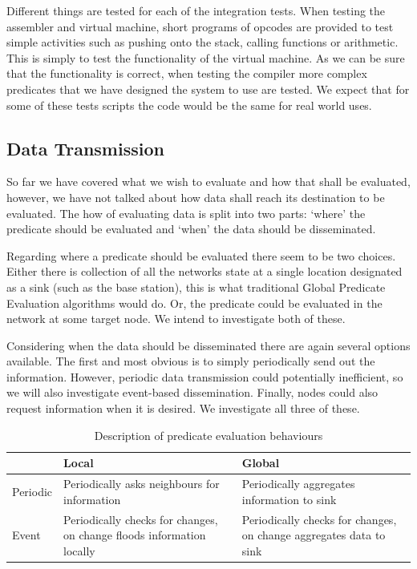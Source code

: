 Different things are tested for each of the integration tests. When testing the assembler and virtual machine, short programs of opcodes are provided to test simple activities such as pushing onto the stack, calling functions or arithmetic. This is simply to test the functionality of the virtual machine. As we can be sure that the functionality is correct, when testing the compiler more complex predicates that we have designed the system to use are tested. We expect that for some of these tests scripts the code would be the same for real world uses.



\subsection{Data Transmission}

So far we have covered what we wish to evaluate and how that shall be evaluated, however, we have not talked about how data shall reach its destination to be evaluated. The how of evaluating data is split into two parts: `where' the predicate should be evaluated and `when' the data should be disseminated.

Regarding where a predicate should be evaluated there seem to be two choices. Either there is collection of all the networks state at a single location designated as a sink (such as the base station), this is what traditional Global Predicate Evaluation algorithms would do. Or, the predicate could be evaluated in the network at some target node. We intend to investigate both of these.

Considering when the data should be disseminated there are again several options available. The first and most obvious is to simply periodically send out the information. However, periodic data transmission could potentially inefficient, so we will also investigate event-based dissemination. Finally, nodes could also request information when it is desired. We investigate all three of these.

\begin{table}[H]
\centering
\begin{tabular}{| l | m{5cm} | m{5cm} |}
\hline
~ & Local & Global \\
\hline
Periodic & Periodically asks neighbours for information & Periodically aggregates information to sink \\
\hline
Event & Periodically checks for changes, on change floods information locally &  Periodically checks for changes, on change aggregates data to sink \\
\hline
\end{tabular}
\caption{Description of predicate evaluation behaviours}
\end{table}


